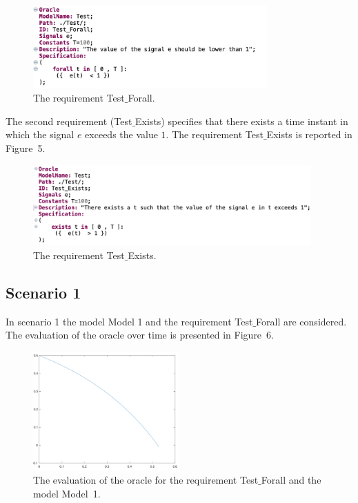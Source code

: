 \documentclass[12pt]{extarticle}
\newcommand{\<}{\langle}
\renewcommand{\>}{\rangle}
\theoremstyle{definition}
\begin{document}
\begin{figure}[h]
\caption{The requirement Test$\_$Forall.}
  \centering
    \includegraphics[width=0.8\textwidth]{Manual/Req1.png}
\end{figure}

\noindent The second requirement (Test$\_$Exists) specifies that there exists a time instant in which the signal $e$  exceeds the value $1$.
The requirement  Test$\_$Exists is reported in Figure~5.

\begin{figure}[h]
\caption{The requirement  Test$\_$Exists.}
  \centering
    \includegraphics[width=0.95\textwidth]{Manual/Req2.png}
\end{figure}

\clearpage

\subsection{Scenario 1}
In scenario 1 the model Model 1 and the requirement Test$\_$Forall are considered. 
The evaluation of the oracle over time is presented in Figure~6.

\begin{figure}[h]
\caption{The evaluation of the oracle for the requirement Test$\_$Forall  and the model Model~1.}
  \centering
    \includegraphics[width=0.5\textwidth]{Manual/resModel1TestForall.png}
\end{figure}
\end{document}
